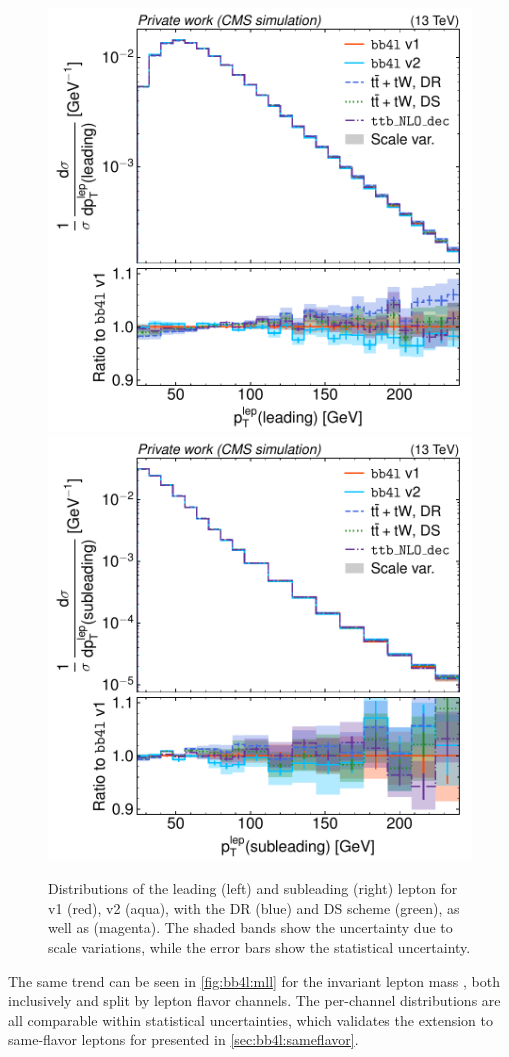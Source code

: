 \begin{figure}[tp]
    \centering
    \includegraphics[width=0.49 \textwidth]{figures/bb4l/generators/MC_TTBAR_DILEP_SPINDENSITY_lep_pt_1.pdf}
    \hfill
    \includegraphics[width=0.49 \textwidth]{figures/bb4l/generators/MC_TTBAR_DILEP_SPINDENSITY_lep_pt_2.pdf}
    \caption{Distributions of the leading (left) and subleading
      (right) lepton \pt for
      \bbfourl v1 (red), v2 (aqua), \tttWsum with the DR (blue) and DS scheme
      (green), as well as \ttb (magenta). The shaded bands show the
      uncertainty due to scale variations, while the error bars show
      the statistical uncertainty.}
    \label{fig:bb4l:leppt}
\end{figure}

The same trend can be seen in \cref{fig:bb4l:mll} for the invariant lepton mass \mll, both inclusively and split by lepton flavor channels. The per-channel distributions are all comparable within statistical uncertainties, which validates the extension to same-flavor leptons for \bbfourl presented in \cref{sec:bb4l:sameflavor}.


